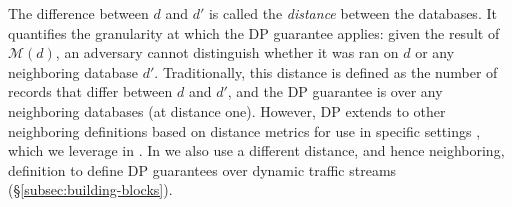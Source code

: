 The difference between $d$ and $d'$ is called the {\em distance} between the
databases.
It quantifies the granularity at which the DP guarantee applies: given the
result of $\mathcal{M}(d)$, an adversary cannot distinguish whether it was ran
on $d$ or any neighboring database $d'$.
Traditionally, this distance is defined as the number of records that differ between $d$ and $d'$, and the DP guarantee is over any neighboring databases (at distance one).
However, DP extends to other neighboring definitions based on distance metrics for use in specific settings \cite{chatzikokolakis2013broadening, lecuyer2019certified}, which we leverage in \sys.
In {\sys} we also use a different distance, and hence neighboring, definition to define DP guarantees over dynamic traffic streams (\S\ref{subsec:building-blocks}).


